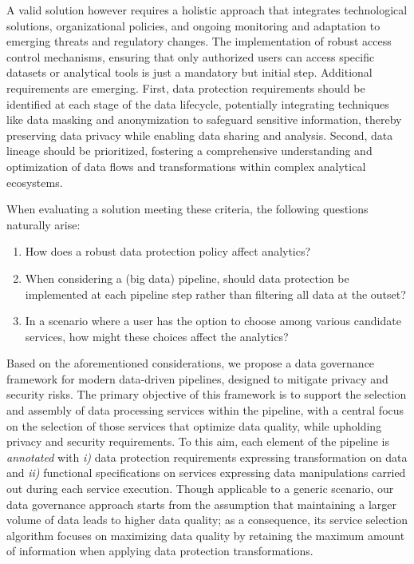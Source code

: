 A valid solution however requires a holistic approach that integrates technological solutions, organizational policies, and ongoing monitoring and adaptation to emerging threats and regulatory changes. The implementation of robust access control mechanisms, ensuring that only authorized users can access specific datasets or analytical tools is just a mandatory but initial step. Additional requirements are emerging. First, data protection requirements should be identified at each stage of the data lifecycle, potentially integrating techniques like data masking and anonymization to safeguard sensitive information, thereby preserving data privacy while enabling data sharing and analysis. Second, data lineage should be prioritized, fostering a comprehensive understanding and optimization of data flows and transformations within complex analytical ecosystems.

When evaluating a solution meeting these criteria, the following questions naturally arise:
\begin{enumerate}
\item How does a robust data protection policy affect analytics?
\item When considering a (big data) pipeline, should data protection be implemented at each pipeline step rather than filtering all data at the outset?
\item In a scenario where a user has the option to choose among various candidate services, how might these choices affect the analytics?
\end{enumerate}

Based on the aforementioned considerations, we propose a data governance framework for modern data-driven pipelines, designed to mitigate privacy and security risks. The primary objective of this framework is to support the selection and assembly of data processing services within the pipeline, with a central focus on the selection of those services that optimize data quality, while upholding privacy and security requirements.
To this aim, each element of the pipeline is \textit{annotated} with \emph{i)} data protection requirements expressing transformation on data and \emph{ii)} functional specifications on services expressing data manipulations carried out during each service execution.
Though applicable to a generic scenario, our data governance approach starts from the assumption that maintaining a larger volume of data leads to higher data quality; as a consequence, its service selection algorithm focuses on maximizing data quality by retaining the maximum amount of information when applying data protection transformations.


